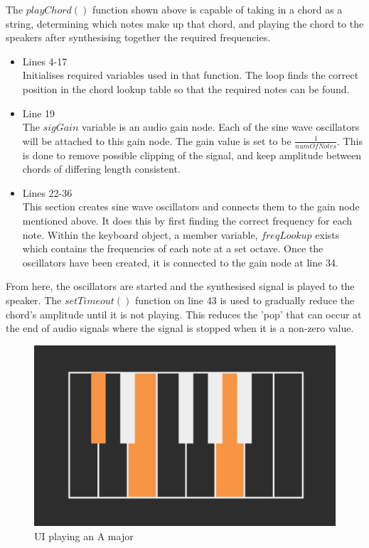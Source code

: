 \documentclass[12pt,a4paper]{article}
\begin{document}
	The $playChord()$ function shown above is capable of taking in a chord as a string, determining which notes make up that chord, and playing the chord to the speakers after synthesising together
	the required frequencies. 
	\begin{itemize}
		\item Lines 4-17\\
				Initialises required variables used in that function. The loop finds the correct position in the chord lookup table so that the required notes can be found. 
\newpage
\vspace*{5mm}
		\item Line 19\\
				The $sigGain$ variable is an audio gain node. Each of the sine wave oscillators will be attached to this gain node. The gain value is set to be $\frac{1}{numOfNotes}$. 
				This is done to remove possible clipping of the signal, and keep amplitude between chords of differing length consistent. 
		\item Lines 22-36\\
				This section creates sine wave oscillators and connects them to the gain node mentioned above. It does this by first finding the correct frequency for each note. Within the keyboard
				object, a member variable, $freqLookup$ exists which contains the frequencies of each note at a set octave. Once the oscillators have been created, it is connected to the gain node at
				line 34.
	\end{itemize}
	From here, the oscillators are started and the synthesised signal is played to the speaker. The $setTimeout()$ function on line 43 is used to gradually reduce the chord's amplitude until it is not
	playing. This reduces the 'pop' that can occur at the end of audio signals where the signal is stopped when it is a non-zero value.
\begin{figure}[h]
	\begin{center}
		\includegraphics[width=0.7\linewidth]{Piano}
	\end{center}
	\caption{UI playing an A major}
\end{figure}
\end{document}
